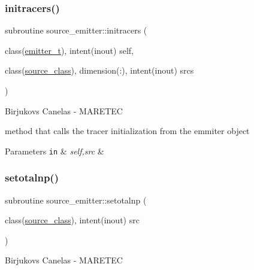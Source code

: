 \subsubsection{\texorpdfstring{initracers()}{initracers()}}
{\footnotesize\ttfamily subroutine source\+\_\+emitter\+::initracers (\begin{DoxyParamCaption}\item[{class(\hyperlink{structsource__emitter_1_1emitter__t}{emitter\+\_\+t}), intent(inout)}]{self,  }\item[{class(\hyperlink{structsource__identity_1_1source__class}{source\+\_\+class}), dimension(\+:), intent(inout)}]{srcs }\end{DoxyParamCaption})\hspace{0.3cm}{\ttfamily [private]}}



Birjukovs Canelas -\/ M\+A\+R\+E\+T\+EC 

method that calls the tracer initialization from the emmiter object 
\begin{DoxyParams}[1]{Parameters}
\mbox{\tt in}  & {\em self,src} & \\
\hline
\end{DoxyParams}
\mbox{\label{namespacesource__emitter_a73d054a39fc1fccfde74173a5c7f2c58}} 
\subsubsection{\texorpdfstring{setotalnp()}{setotalnp()}}
{\footnotesize\ttfamily subroutine source\+\_\+emitter\+::setotalnp (\begin{DoxyParamCaption}\item[{class(\hyperlink{structsource__identity_1_1source__class}{source\+\_\+class}), intent(inout)}]{src }\end{DoxyParamCaption})\hspace{0.3cm}{\ttfamily [private]}}



Birjukovs Canelas -\/ M\+A\+R\+E\+T\+EC 

